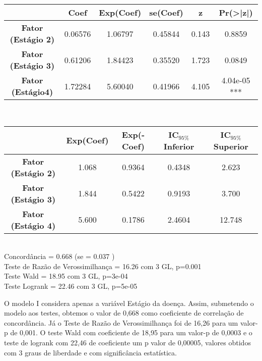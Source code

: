 \documentclass[12pt,a4paper]{article}
\begin{document}
	 \begin{center}
	 	\begin{tabular}{|c|c|c|c|c|c|}\hline
	 		& \textbf{Coef} & \textbf{Exp(Coef)} & \textbf{se(Coef)} & \textbf{z} & \textbf{Pr(>|z|)}\\ \hline   
	 		\textbf{Fator (Estágio 2)} & 0.06576 &  1.06797 & 0.45844 & 0.143 &   0.8859\\ \hline
	 		\textbf{Fator (Estágio 3)} & 0.61206 &  1.84423 & 0.35520 & 1.723 &   0.0849\\ \hline
	 		\textbf{Fator (Estágio4)} & 1.72284 &  5.60040 & 0.41966 & 4.105 & 4.04e-05 ***\\ \hline
	 	\end{tabular}
	 	\vspace{1cm}\\
	 	\begin{tabular}{|c|c|c|c|c|}\hline
	 		& \textbf{Exp(Coef)} & \textbf{Exp(-Coef)} & \textbf{IC$_{95\%}$ Inferior} & \textbf{IC$_{95\%}$ Superior}\\ \hline
	 		\textbf{Fator (Estágio 2)} & 1.068 & 0.9364 & 0.4348 & 2.623\\ \hline
	 		\textbf{Fator (Estágio 3)} & 1.844 & 0.5422 & 0.9193 & 3.700\\ \hline
	 		\textbf{Fator (Estágio 4)} & 5.600 & 0.1786 & 2.4604 & 12.748\\ \hline
	 	\end{tabular}
	 	\vspace{0.25cm}\\
	 	Concordância = 0.668  (se = 0.037 )\\
	 	Teste de Razão de Verossimilhança = 16.26  com 3 GL,   p=0.001\\
	 	Teste Wald = 18.95  com 3 GL,   p=3e-04\\
	 	Teste Logrank = 22.46  com 3 GL,   p=5e-05\\
	\end{center}
 	\vspace{1cm}
 	O modelo I considera apenas a variável Estágio da doença. Assim, submetendo o modelo aos testes, obtemos o valor de 0,668 como coeficiente de correlação de concordância. Já o Teste de Razão de Verossimilhança foi de 16,26 para um valor-p de 0,001. O teste Wald com coeficiente de 18,95 para um valor-p de 0,0003 e o teste de logrank com 22,46 de coeficiente um p valor de 0,00005, valores obtidos com 3 graus de liberdade e com significância estatística.\\
 	\vspace{2cm}\\
\end{document}
